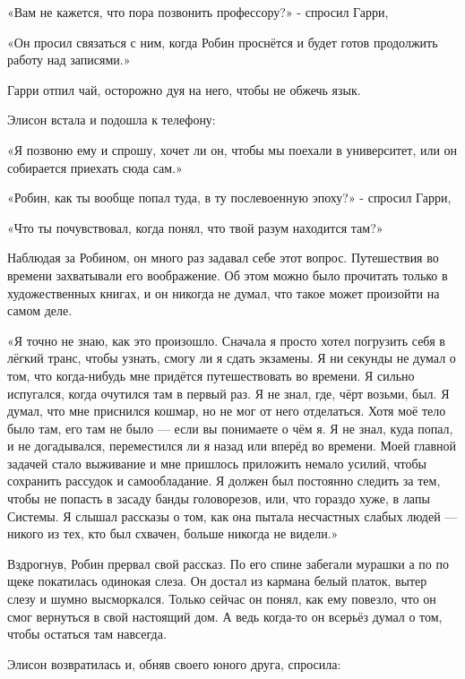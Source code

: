 \documentclass[a4paper,12pt]{book}
\begin{document}
\par
«Вам не кажется, что пора позвонить профессору?» - спросил Гарри,
\par
«Он просил связаться с ним, когда Робин проснётся и будет готов продолжить работу над записями.»
\par
Гарри отпил чай, осторожно дуя на него, чтобы не обжечь язык.
\par
Элисон встала и подошла к телефону:
\par
«Я позвоню ему и спрошу, хочет ли он, чтобы мы поехали в университет, или он собирается приехать сюда сам.»\\
\par
«Робин, как ты вообще попал туда, в ту послевоенную эпоху?» - спросил Гарри,
\par
«Что ты почувствовал, когда понял, что твой разум находится там?»
\par
Наблюдая за Робином, он много раз задавал себе этот вопрос. Путешествия во времени захватывали его воображение. Об этом можно было прочитать только в художественных книгах, и он никогда не думал, что такое может произойти на самом деле.
\par
«Я точно не знаю, как это произошло. Сначала я просто хотел погрузить себя в лёгкий транс, чтобы узнать, смогу ли я сдать экзамены. Я ни секунды не думал о том, что когда-нибудь мне придётся путешествовать во времени. Я сильно испугался, когда очутился там в первый раз. Я не знал, где, чёрт возьми, был. Я думал, что мне приснился кошмар, но не мог от него отделаться. Хотя моё тело было там, его там не было — если вы понимаете о чём я. Я не знал, куда попал, и не догадывался, переместился ли я назад или вперёд во времени. Моей главной задачей стало выживание и мне пришлось приложить немало усилий, чтобы сохранить рассудок и самообладание. Я должен был постоянно следить за тем, чтобы не попасть в засаду банды головорезов, или, что гораздо хуже, в лапы Системы. Я слышал рассказы о том, как она пытала несчастных слабых людей — никого из тех, кто был схвачен, больше никогда не видели.»
\par
Вздрогнув, Робин прервал свой рассказ. По его спине забегали мурашки а по по щеке покатилась одинокая слеза. Он достал из кармана белый платок, вытер слезу и шумно высморкался. Только сейчас он понял, как ему повезло, что он смог вернуться в свой настоящий дом. А ведь когда-то он всерьёз думал о том, чтобы остаться там навсегда.\\
\par
Элисон возвратилась и, обняв своего юного друга, спросила:
\end{document}
